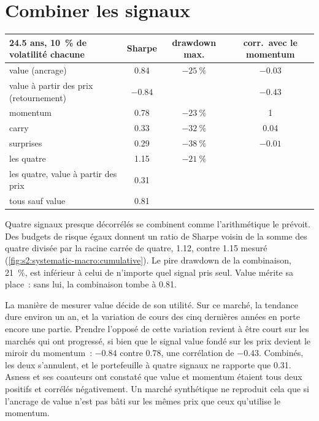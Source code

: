 \section{Combiner les signaux}

\begin{center}
\small
\begin{tabular}{@{}lccc@{}}
\toprule
24.5 ans, 10~\% de volatilité chacune & Sharpe & drawdown max. & corr.\ avec le momentum\\
\midrule
value (ancrage) & 0.84 & $-25~\%$ & $-0.03$\\
value à partir des prix (retournement) & $-0.84$ & & $-0.43$\\
momentum & 0.78 & $-23~\%$ & 1\\
carry & 0.33 & $-32~\%$ & 0.04\\
surprises & 0.29 & $-38~\%$ & $-0.01$\\
\midrule
les quatre & 1.15 & $-21~\%$ &\\
les quatre, value à partir des prix & 0.31 & &\\
tous sauf value & 0.81 & &\\
\bottomrule
\end{tabular}
\end{center}

Quatre signaux presque décorrélés se combinent comme l'arithmétique le prévoit. Des budgets de risque égaux donnent un ratio de Sharpe voisin de la somme des quatre divisée par la
racine carrée de quatre, 1.12, contre 1.15 mesuré (\cref{fig:s2:systematic-macro:cumulative}). Le pire drawdown de la combinaison, 21~\%, est inférieur à
celui de n'importe quel signal pris seul. Value mérite sa place~: sans lui, la combinaison tombe à 0.81.

La manière de mesurer value décide de son utilité. Sur ce marché, la tendance dure environ un an, et la variation de cours des cinq dernières années en porte encore une
partie. Prendre l'opposé de cette variation revient à être court sur les marchés qui ont progressé, si bien que le signal value fondé sur les prix devient le miroir du momentum~: $-0.84$ contre 0.78, une
corrélation de $-0.43$. Combinés, les deux s'annulent, et le portefeuille à quatre signaux ne rapporte que 0.31. Asness et ses coauteurs ont constaté que value et momentum étaient tous deux
positifs et corrélés négativement. Un marché synthétique ne reproduit cela que si l'ancrage de value n'est pas bâti sur les mêmes prix que ceux qu'utilise le momentum.

